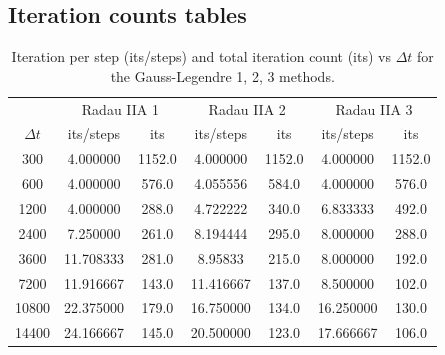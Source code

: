 \documentclass[a4paper, 12pt]{article}
\begin{document}
\cleardoublepage

\subsection{Iteration counts tables}

\begin{table}
  \centering
  \begin{tabular}{ccccccc}
    & \multicolumn{2}{c}{Radau IIA 1} &
    \multicolumn{2}{c}{Radau IIA 2} &
    \multicolumn{2}{c}{Radau IIA 3} \\ 
   $\Delta t$  &  its/steps  &  its 
   &  its/steps  &  its
   &  its/steps  &  its 
   \\ \hline
  300  &               4.000000  &  1152.0    &        4.000000  &  1152.0   &            4.000000  &  1152.0 \\
   600  &             4.000000  &   576.0    &       4.055556  &   584.0    &          4.000000   &  576.0 \\
  1200   &               4.000000   &  288.0   &          4.722222  &   340.0    &             6.833333  &   492.0\\
  2400    &             7.250000   &  261.0   &           8.194444   &  295.0    &             8.000000   &  288.0\\
  3600     &           11.708333  &   281.0   &        8.95833  & 215.0     &            8.000000  &   192.0 \\
  7200     &            11.916667  &   143.0    &        11.416667  &   137.0    &              8.500000  &   102.0\\
  10800    &             22.375000 &    179.0   &        16.750000   &  134.0    &           16.250000   &  130.0 \\
  14400    &             24.166667  &   145.0   &        20.500000   &  123.0     &          17.666667   &  106.0
\end{tabular}
\caption{Iteration per step (its/steps) and total iteration count (its) vs $\Delta t$ for the Gauss-Legendre  1, 2, 3 methods.}
\label{tab_niter_vs_dt G}
\end{table}
\end{document}
